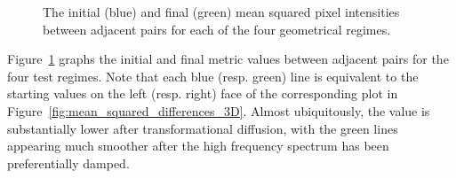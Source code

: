 \begin{figure}
    \caption{The initial (blue) and final (green) mean squared pixel intensities between adjacent pairs for each of the four geometrical regimes.}
    \label{fig:mean_squared_differences_2D}
  \end{figure}

  Figure~\ref{fig:mean_squared_differences_2D} graphs the initial and final metric values between adjacent pairs for the four test regimes. Note that each blue (resp. green) line is equivalent to the starting values on the left (resp. right) face of the corresponding plot in Figure~\ref{fig:mean_squared_differences_3D}. Almost ubiquitously, the value is substantially lower after transformational diffusion, with the green lines appearing much smoother after the high frequency spectrum has been preferentially damped.
  
